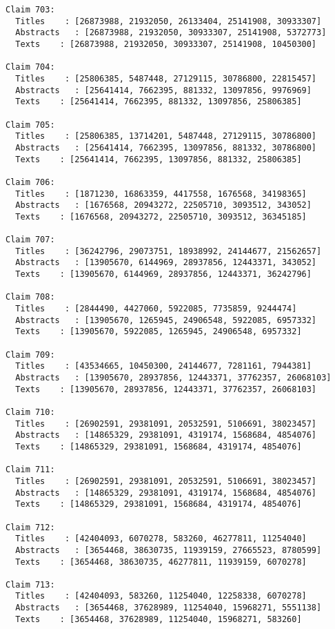 \documentclass[11pt]{article}
\begin{document}
\begin{Verbatim}[commandchars=\\\{\}]
Claim 703:
  Titles    : [26873988, 21932050, 26133404, 25141908, 30933307]
  Abstracts   : [26873988, 21932050, 30933307, 25141908, 5372773]
  Texts    : [26873988, 21932050, 30933307, 25141908, 10450300]

Claim 704:
  Titles    : [25806385, 5487448, 27129115, 30786800, 22815457]
  Abstracts   : [25641414, 7662395, 881332, 13097856, 9976969]
  Texts    : [25641414, 7662395, 881332, 13097856, 25806385]

Claim 705:
  Titles    : [25806385, 13714201, 5487448, 27129115, 30786800]
  Abstracts   : [25641414, 7662395, 13097856, 881332, 30786800]
  Texts    : [25641414, 7662395, 13097856, 881332, 25806385]

Claim 706:
  Titles    : [1871230, 16863359, 4417558, 1676568, 34198365]
  Abstracts   : [1676568, 20943272, 22505710, 3093512, 343052]
  Texts    : [1676568, 20943272, 22505710, 3093512, 36345185]

Claim 707:
  Titles    : [36242796, 29073751, 18938992, 24144677, 21562657]
  Abstracts   : [13905670, 6144969, 28937856, 12443371, 343052]
  Texts    : [13905670, 6144969, 28937856, 12443371, 36242796]

Claim 708:
  Titles    : [2844490, 4427060, 5922085, 7735859, 9244474]
  Abstracts   : [13905670, 1265945, 24906548, 5922085, 6957332]
  Texts    : [13905670, 5922085, 1265945, 24906548, 6957332]

Claim 709:
  Titles    : [43534665, 10450300, 24144677, 7281161, 7944381]
  Abstracts   : [13905670, 28937856, 12443371, 37762357, 26068103]
  Texts    : [13905670, 28937856, 12443371, 37762357, 26068103]

Claim 710:
  Titles    : [26902591, 29381091, 20532591, 5106691, 38023457]
  Abstracts   : [14865329, 29381091, 4319174, 1568684, 4854076]
  Texts    : [14865329, 29381091, 1568684, 4319174, 4854076]

Claim 711:
  Titles    : [26902591, 29381091, 20532591, 5106691, 38023457]
  Abstracts   : [14865329, 29381091, 4319174, 1568684, 4854076]
  Texts    : [14865329, 29381091, 1568684, 4319174, 4854076]

Claim 712:
  Titles    : [42404093, 6070278, 583260, 46277811, 11254040]
  Abstracts   : [3654468, 38630735, 11939159, 27665523, 8780599]
  Texts    : [3654468, 38630735, 46277811, 11939159, 6070278]

Claim 713:
  Titles    : [42404093, 583260, 11254040, 12258338, 6070278]
  Abstracts   : [3654468, 37628989, 11254040, 15968271, 5551138]
  Texts    : [3654468, 37628989, 11254040, 15968271, 583260]


\end{Verbatim}
\end{document}
